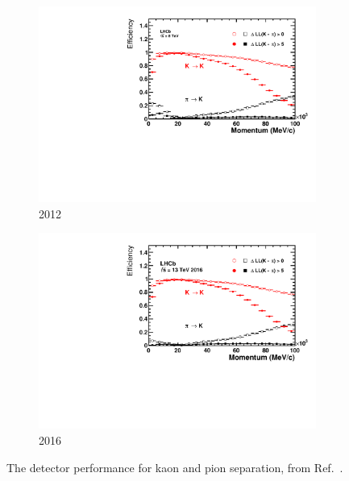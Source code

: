 \begin{figure}[!h]
    \centering
    \begin{subfigure}[t]{0.4\textwidth}
        \centering        
        \includegraphics[width=1.0\textwidth]{figs/Detector/rich_k_pi_2012.pdf}
        \caption{2012}
    \end{subfigure}
    \begin{subfigure}[t]{0.4\textwidth}
        \centering
        \includegraphics[width=1.0\textwidth]{figs/Detector/rich_k_pi_2016.pdf}
        \caption{2016}
    \end{subfigure}
    \caption{The \rich detector performance for kaon and pion separation, from Ref.~\cite{LHCb-DP-2012-003}.}
    \label{fig:Dec_rich_k_pi}   
\end{figure}



